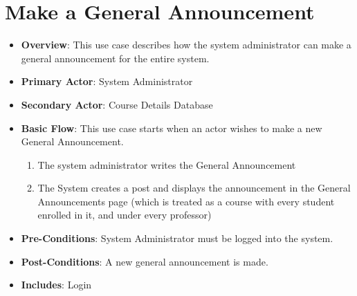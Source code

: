 \documentclass[12pt, a4]{report}
\begin{document}
\section{Make a General Announcement}
\begin{itemize}
    \item \textbf{Overview}: This use case describes how the system administrator can make a general announcement for the entire system.
    \item \textbf{Primary Actor}: System Administrator
    \item \textbf{Secondary Actor}: Course Details Database
    \item \textbf{Basic Flow}: This use case starts when an actor wishes to make a new General Announcement.
        \begin{enumerate}
            \item The system administrator writes the General Announcement
            \item The System creates a post and displays the announcement in the General Announcements page (which is treated as a course with every student enrolled in it, and under every professor)
        \end{enumerate}
    \item \textbf{Pre-Conditions}: System Administrator must be logged into the system.
    \item \textbf{Post-Conditions}: A new general announcement is made.
    \item \textbf{Includes}: Login
\end{itemize}

\end{document}
